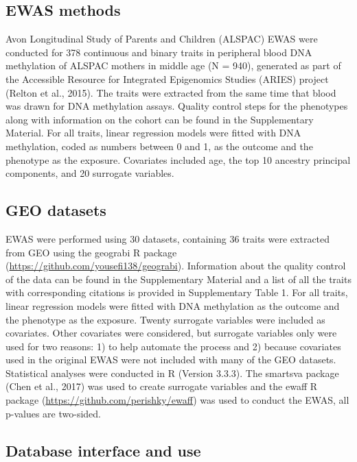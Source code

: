 \documentclass[11pt,twoside]{bristolthesis}
\begin{document}
\hypertarget{ewas-methods}{%
\subsection{EWAS methods}\label{ewas-methods}}

Avon Longitudinal Study of Parents and Children (ALSPAC)
EWAS were conducted for 378 continuous and binary traits in peripheral blood DNA methylation of ALSPAC mothers in middle age (N = 940), generated as part of the Accessible Resource for Integrated Epigenomics Studies (ARIES) project (Relton et al., 2015). The traits were extracted from the same time that blood was drawn for DNA methylation assays. Quality control steps for the phenotypes along with information on the cohort can be found in the Supplementary Material.
For all traits, linear regression models were fitted with DNA methylation, coded as numbers between 0 and 1, as the outcome and the phenotype as the exposure. Covariates included age, the top 10 ancestry principal components, and 20 surrogate variables.

\hypertarget{geo-datasets}{%
\subsection{GEO datasets}\label{geo-datasets}}

EWAS were performed using 30 datasets, containing 36 traits were extracted from GEO using the geograbi R package (\url{https://github.com/yousefi138/geograbi}). Information about the quality control of the data can be found in the Supplementary Material and a list of all the traits with corresponding citations is provided in Supplementary Table 1.
For all traits, linear regression models were fitted with DNA methylation as the outcome and the phenotype as the exposure. Twenty surrogate variables were included as covariates. Other covariates were considered, but surrogate variables only were used for two reasons: 1) to help automate the process and 2) because covariates used in the original EWAS were not included with many of the GEO datasets.
Statistical analyses were conducted in R (Version 3.3.3). The smartsva package (Chen et al., 2017) was used to create surrogate variables and the ewaff R package (\url{https://github.com/perishky/ewaff}) was used to conduct the EWAS, all p-values are two-sided.

\hypertarget{database-interface-and-use}{%
\subsection{Database interface and use}\label{database-interface-and-use}}
\end{document}
